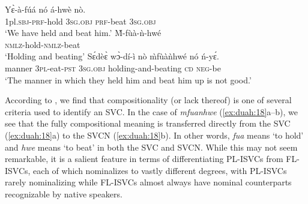 \documentclass[output=paper,modfonts,nonflat,
colorlinks, citecolor=brown,
]{langsci/langscibook}
\begin{document}
\ea\label{ex:duah:18}
\ea\label{ex:duah:18a}
\gll Yɛ̀-à-fúá nó á-hwè nò.\\
1pl.\textsc{sbj}-\textsc{prf}-hold 3\textsc{sg}.\textsc{obj} \textsc{prf}-beat 3\textsc{sg}.\textsc{obj}\\
\glt `We have held and beat him.'
\ex\label{ex:duah:18b}
\gll M̀-fùà-ǹ-hwé\\
\textsc{nmlz}-hold-\textsc{nmlz}-beat\\
\glt `Holding and beating'
\ex\label{ex:duah:18c}
\gll Sɛ́dèɛ̀ wɔ̀-dí-ì nò m̀fùàǹhwé nó ń-yɛ́.\\
manner 3\textsc{pl}-eat-\textsc{pst}	3\textsc{sg}.\textsc{obj}	holding-and-beating	\textsc{cd} \textsc{neg}-be\\
\glt `The manner in which they held him and beat him up is not good.'
\z
\z

According to \citet{barkema1996}, we find that compositionality (or lack thereof) is one of several criteria used to identify an SVC. In the case of \textit{mfuanhwe} (\ref{ex:duah:18}a--b), we see that the fully compositional meaning is transferred directly from the SVC (\ref{ex:duah:18}a) to the SVCN (\ref{ex:duah:18}b). In other words, \textit{fua} means ‘to hold’ and \textit{hwe} means ‘to beat’ in both the SVC and SVCN. While this may not seem remarkable, it is a salient feature in terms of differentiating PL-ISVCs from FL-ISVCs, each of which nominalizes to vastly different degrees, with PL-ISVCs rarely nominalizing while FL-ISVCs almost always have nominal counterparts recognizable by native speakers.
\end{document}
